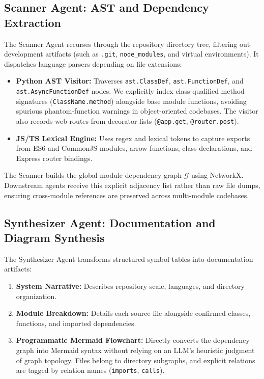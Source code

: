 \documentclass[conference]{IEEEtran}
\begin{document}
\subsection{Scanner Agent: AST and Dependency Extraction}
The Scanner Agent recurses through the repository directory tree, filtering out development artifacts (such as \texttt{.git}, \texttt{node\_modules}, and virtual environments). It dispatches language parsers depending on file extensions:
\begin{itemize}
    \item \textbf{Python AST Visitor:} Traverses \texttt{ast.ClassDef}, \texttt{ast.FunctionDef}, and \texttt{ast.AsyncFunctionDef} nodes. We explicitly index class-qualified method signatures (\texttt{ClassName.method}) alongside base module functions, avoiding spurious phantom-function warnings in object-oriented codebases. The visitor also records web routes from decorator lists (\texttt{@app.get}, \texttt{@router.post}).
    \item \textbf{JS/TS Lexical Engine:} Uses regex and lexical tokens to capture exports from ES6 and CommonJS modules, arrow functions, class declarations, and Express router bindings.
\end{itemize}
The Scanner builds the global module dependency graph $\mathcal{G}$ using NetworkX. Downstream agents receive this explicit adjacency list rather than raw file dumps, ensuring cross-module references are preserved across multi-module codebases.

\subsection{Synthesizer Agent: Documentation and Diagram Synthesis}
The Synthesizer Agent transforms structured symbol tables into documentation artifacts:
\begin{enumerate}
    \item \textbf{System Narrative:} Describes repository scale, languages, and directory organization.
    \item \textbf{Module Breakdown:} Details each source file alongside confirmed classes, functions, and imported dependencies.
    \item \textbf{Programmatic Mermaid Flowchart:} Directly converts the dependency graph into Mermaid syntax without relying on an LLM's heuristic judgment of graph topology. Files belong to directory subgraphs, and explicit relations are tagged by relation names (\texttt{imports}, \texttt{calls}).
\end{enumerate}
\end{document}
